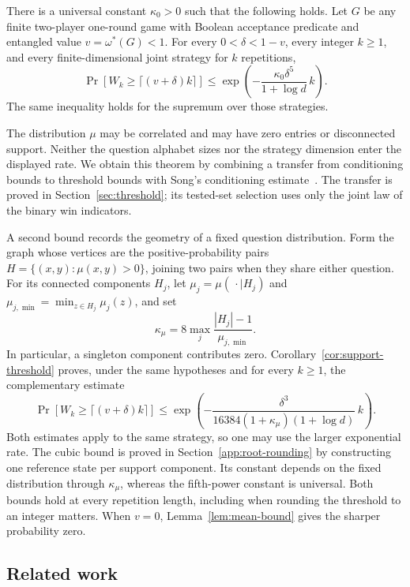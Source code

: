 \begin{theorem}\label{thm:main}
There is a universal constant $\kappa_0>0$ such that the following holds.
Let $G$ be any finite two-player one-round game with Boolean acceptance
predicate and entangled value $v=\omega^*(G)<1$. For every
$0<\delta<1-v$, every integer $k\ge1$, and every finite-dimensional
joint strategy for $k$ repetitions,
\begin{equation}\label{eq:main}
 \Pr\!\left[W_k\ge\lceil(v+\delta)k\rceil\right]
 \le \exp\!\left(-\frac{\kappa_0\delta^5}
                         {1+\log d}\,k\right).
\end{equation}
The same inequality holds for the supremum over those strategies.
\end{theorem}

The distribution $\mu$ may be correlated and may have zero entries or
disconnected support. Neither the question alphabet sizes nor the
strategy dimension enter the displayed rate. We obtain this theorem by
combining a transfer from conditioning bounds to threshold bounds with
Song's conditioning estimate~\cite[Lemma~4.4]{song2026}. The transfer is
proved in Section~\ref{sec:threshold}; its tested-set selection uses
only the joint law of the binary win indicators.

A second bound records the geometry of a fixed question distribution.
Form the graph whose vertices
are the positive-probability pairs $H=\{(x,y):\mu(x,y)>0\}$, joining two
pairs when they share either question. For its connected components
$H_j$, let $\mu_j=\mu(\,\cdot\mid H_j)$ and
$\mu_{j,\min}=\min_{z\in H_j}\mu_j(z)$, and set
\[
 \kappa_\mu=8\max_j\frac{|H_j|-1}{\mu_{j,\min}}.
\]
In particular, a singleton component contributes zero.
Corollary~\ref{cor:support-threshold} proves, under the same hypotheses and for
every $k\ge1$, the complementary estimate
\[
 \Pr\!\left[W_k\ge\lceil(v+\delta)k\rceil\right]
 \le\exp\!\left(-\frac{\delta^3}
 {16384(1+\kappa_\mu)(1+\log d)}\,k\right).
\]
Both estimates apply to the same strategy, so one may use the larger
exponential rate. The cubic bound is proved in
Section~\ref{app:root-rounding} by constructing one reference state per
support component. Its constant depends on the fixed distribution through
$\kappa_\mu$, whereas the fifth-power constant is universal. Both bounds
hold at every repetition length, including when rounding the threshold
to an integer matters. When $v=0$, Lemma~\ref{lem:mean-bound} gives the
sharper probability zero.

\subsection{Related work}

